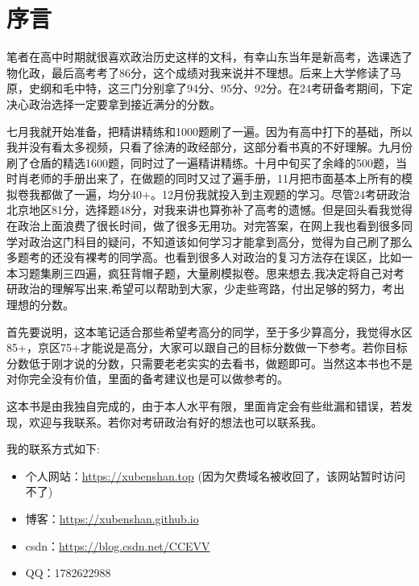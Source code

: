 \documentclass[lang=cn,blue,10pt,scheme=chinese,twocol]{zznote}
\begin{document}


\chapter*{\siyuan 序\;\;\;\;言}
{\siyuanone

	笔者在高中时期就很喜欢政治历史这样的文科，有幸山东当年是新高考，选课选了物化政，最后高考考了86分，这个成绩对我来说并不理想。后来上大学修读了马原，史纲和毛中特，这三门分别拿了94分、95分、92分。在24考研备考期间，下定决心政治选择一定要拿到接近满分的分数。

	七月我就开始准备，把精讲精练和1000题刷了一遍。因为有高中打下的基础，所以我并没有看太多视频，只看了徐涛的政经部分，这部分看书真的不好理解。九月份刷了仓盾的精选1600题，同时过了一遍精讲精练。十月中旬买了余峰的500题，当时肖老师的手册出来了，在做题的同时又过了遍手册，11月把市面基本上所有的模拟卷我都做了一遍，均分40+。12月份我就投入到主观题的学习。尽管24考研政治北京地区81分，选择题48分，对我来讲也算弥补了高考的遗憾。但是回头看我觉得在政治上面浪费了很长时间，做了很多无用功。对完答案，在网上我也看到很多同学对政治这门科目的疑问，不知道该如何学习才能拿到高分，觉得为自己刷了那么多题考的还没有裸考的同学高。也看到很多人对政治的复习方法存在误区，比如一本习题集刷三四遍，疯狂背帽子题，大量刷模拟卷。思来想去,我决定将自己对考研政治的理解写出来,希望可以帮助到大家，少走些弯路，付出足够的努力，考出理想的分数。

	首先要说明，这本笔记适合那些希望考高分的同学，至于多少算高分，我觉得水区85+，京区75+才能说是高分，大家可以跟自己的目标分数做一下参考。若你目标分数低于刚才说的分数，只需要老老实实的去看书，做题即可。当然这本书也不是对你完全没有价值，里面的备考建议也是可以做参考的。

	这本书是由我独自完成的，由于本人水平有限，里面肯定会有些纰漏和错误，若发现，欢迎与我联系。若你对考研政治有好的想法也可以联系我。

	我的联系方式如下:
	\begin{itemize}
		\item 个人网站：\href{https://xubenshan.top}{https://xubenshan.top} \;\;(因为欠费域名被收回了，该网站暂时访问不了)
		\item 博客：\href{https://xubenshan.github.io}{https://xubenshan.github.io}
		\item csdn：\href{https://blog.csdn.net/CCEVV}{https://blog.csdn.net/CCEVV}
		\item QQ：1782622988
	\end{itemize}

}
\end{document}
